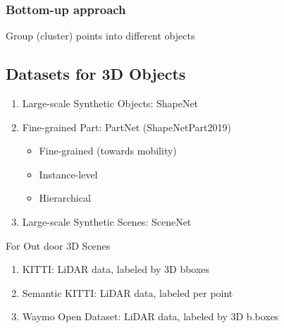 \subsubsection{Bottom-up approach}
Group (cluster) points into different objects

\subsection{Datasets for 3D Objects}
\begin{enumerate}
    \item Large-scale Synthetic Objects: ShapeNet
    \item Fine-grained Part: PartNet (ShapeNetPart2019)
    \begin{itemize}
        \item Fine-grained (towards mobility)
        \item Instance-level
        \item Hierarchical
    \end{itemize}
    \item Large-scale Synthetic Scenes: SceneNet
\end{enumerate}

For Out door 3D Scenes
\begin{enumerate}
    \item KITTI: LiDAR data, labeled by 3D bboxes
    \item Semantic KITTI: LiDAR data, labeled per point
    \item Waymo Open Dataset: LiDAR data, labeled by 3D b.boxes
\end{enumerate}
